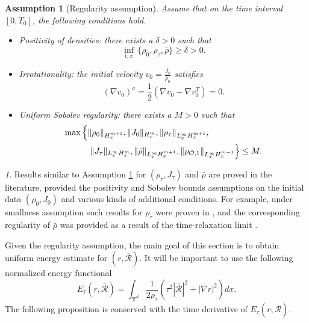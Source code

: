 \documentclass[english]{amsart}
\theoremstyle{plain}
\theoremstyle{definition}
\theoremstyle{remark}
\newtheorem{rem}[thm]{\protect\remarkname}
\theoremstyle{plain}
\theoremstyle{plain}
\theoremstyle{plain}
\newtheorem{assumption}{Assumption}
\providecommand{\remarkname}{Remark}
\def\T{{\mathbf T}}%
\numberwithin{equation}{section}
\begin{document}
\begin{assumption}[Regularity assumption]\label{asmp:RA}
Assume that on the time interval $[0,T_0]$, the following conditions hold.
\begin{itemize}
\item[(1)] Positivity of densities: there exists a $\delta>0$ such that
\[
\inf_{t,x}\,\{\rho_0,\rho_\tau,\bar\rho\}\geq\delta >0.
\]

\item[(2)] Irrotationality: the initial velocity $v_0=\frac{J_0}{\rho_0}$ satisfies
\[
(\nabla v_0)^a=\frac12\left(\nabla v_0-\nabla v_0^T\right)=0.
\]

\item[(3)] Uniform Sobolev regularity: there exists a $M>0$ such that
\begin{align*}
\max&\left\{\|\rho_0\|_{H^{m+1}_x},\|J_0\|_{H^{m}_x},\|\rho_\tau\|_{L^\infty_x H^{m+1}_x},\right.\\
&\hspace{0.3cm}\left.\|J_\tau\|_{L^\infty_x H^{m}_x},\|\bar\rho\|_{L^\infty_x H^{m+1}_x},\|\rho_{\mathcal{O},1}\|_{L^\infty_x H^{m-1}_x}\right\}\leq M.
\end{align*}
\end{itemize}
\end{assumption}

\begin{rem}
Results similar to Assumption \ref{asmp:RA} for $(\rho_\tau,J_\tau)$ and $\bar\rho$ are proved in the literature, provided the positivity and Sobolev bounds assumptions on the initial data $(\rho_0,J_0)$ and various kinds of additional conditions. For example, under smallness assumption such results for $\rho_\tau$ were proven in \cite{JP,LM}, and the corresponding regularity of $\bar\rho$ was provided as a result of the time-relaxation limit \cite{JLM}.


\end{rem}

Given the regularity assumption, the main goal of this section is to obtain uniform energy estimate for  $(r,\overline{\mathcal{R}})$. It will be important to use the following normalized energy functional
\begin{equation}\label{eq:en_r}
E_\tau(r,\overline{\mathcal{R}})=\int_{\T^d} \frac{1}{2\rho_\tau}(\tau^2|\overline{\mathcal{R}}|^2+|\nabla r|^2)dx.
\end{equation}
The following proposition is conserved with the time derivative of $E_\tau(r,\overline{\mathcal{R}})$.
\end{document}
